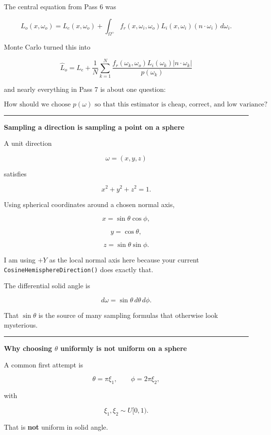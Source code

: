 The central equation from Pass 6 was

\[
L_o(x,\omega_o)
=
L_e(x,\omega_o)
+
\int_{\Omega^+}
f_r(x,\omega_i,\omega_o)
L_i(x,\omega_i)
\left(n\cdot\omega_i\right)
\,d\omega_i.
\]

Monte Carlo turned this into

\[
\boxed{
\hat L_o
=
L_e+
\frac{1}{N}
\sum_{k=1}^{N}
\frac{
f_r(\omega_k,\omega_o)
L_i(\omega_k)
|n\cdot\omega_k|
}{
p(\omega_k)
}
}
\]

and nearly everything in Pass 7 is about one question:

\[
\boxed{
\text{How should we choose }p(\omega)\text{ so that this estimator is cheap, correct, and low variance?}
}
\]

\begin{center}\rule{0.5\linewidth}{0.5pt}\end{center}

\textbf{Sampling a direction is sampling a point on a sphere}

A unit direction

\[
\omega=(x,y,z)
\]

satisfies

\[
x^2+y^2+z^2=1.
\]

Using spherical coordinates around a chosen normal axis,

\[
x=\sin\theta\cos\phi,
\]

\[
y=\cos\theta,
\]

\[
z=\sin\theta\sin\phi.
\]

I am using \(+Y\) as the local normal axis here because your current \texttt{CosineHemisphereDirection()} does exactly that.

The differential solid angle is

\[
\boxed{
d\omega=\sin\theta\,d\theta\,d\phi.
}
\]

That \(\sin\theta\) is the source of many sampling formulas that otherwise look mysterious.

\begin{center}\rule{0.5\linewidth}{0.5pt}\end{center}

\textbf{Why choosing \(\theta\) uniformly is not uniform on a sphere}

A common first attempt is

\[
\theta=\pi\xi_1,
\qquad
\phi=2\pi\xi_2,
\]

with

\[
\xi_1,\xi_2\sim U[0,1).
\]

That is \textbf{not} uniform in solid angle.

